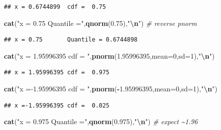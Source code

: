 \documentclass[
  lang=cn,
  11pt,
  scheme=chinese,
  chinesefont=nofont,
  citestyle=gb7714-2015,
  bibstyle=gb7714-2015]{elegantbook}
\newenvironment{Shaded}{\begin{snugshade}}{\end{snugshade}}
\newcommand{\AttributeTok}[1]{\textcolor[rgb]{0.13,0.29,0.53}{#1}}
\newcommand{\CommentTok}[1]{\textcolor[rgb]{0.56,0.35,0.01}{\textit{#1}}}
\newcommand{\DecValTok}[1]{\textcolor[rgb]{0.00,0.00,0.81}{#1}}
\newcommand{\FloatTok}[1]{\textcolor[rgb]{0.00,0.00,0.81}{#1}}
\newcommand{\FunctionTok}[1]{\textcolor[rgb]{0.13,0.29,0.53}{\textbf{#1}}}
\newcommand{\NormalTok}[1]{#1}
\newcommand{\SpecialCharTok}[1]{\textcolor[rgb]{0.81,0.36,0.00}{\textbf{#1}}}
\newcommand{\StringTok}[1]{\textcolor[rgb]{0.31,0.60,0.02}{#1}}
\begin{document}
\begin{verbatim}
## x = 0.6744899  cdf =  0.75
\end{verbatim}

\begin{Shaded}
\begin{Highlighting}[]
\FunctionTok{cat}\NormalTok{(}\StringTok{"x = 0.75       Quantile ="}\NormalTok{,}\FunctionTok{qnorm}\NormalTok{(}\FloatTok{0.75}\NormalTok{),}\StringTok{"}\SpecialCharTok{\textbackslash{}n}\StringTok{"}\NormalTok{) }\CommentTok{\# reverse pnorm  }
\end{Highlighting}
\end{Shaded}

\begin{verbatim}
## x = 0.75       Quantile = 0.6744898
\end{verbatim}

\begin{Shaded}
\begin{Highlighting}[]
\FunctionTok{cat}\NormalTok{(}\StringTok{"x = 1.95996395 cdf = "}\NormalTok{,}\FunctionTok{pnorm}\NormalTok{(}\FloatTok{1.95996395}\NormalTok{,}\AttributeTok{mean=}\DecValTok{0}\NormalTok{,}\AttributeTok{sd=}\DecValTok{1}\NormalTok{),}\StringTok{"}\SpecialCharTok{\textbackslash{}n}\StringTok{"}\NormalTok{)  }
\end{Highlighting}
\end{Shaded}

\begin{verbatim}
## x = 1.95996395 cdf =  0.975
\end{verbatim}

\begin{Shaded}
\begin{Highlighting}[]
\FunctionTok{cat}\NormalTok{(}\StringTok{"x ={-}1.95996395 cdf = "}\NormalTok{,}\FunctionTok{pnorm}\NormalTok{(}\SpecialCharTok{{-}}\FloatTok{1.95996395}\NormalTok{,}\AttributeTok{mean=}\DecValTok{0}\NormalTok{,}\AttributeTok{sd=}\DecValTok{1}\NormalTok{),}\StringTok{"}\SpecialCharTok{\textbackslash{}n}\StringTok{"}\NormalTok{)  }
\end{Highlighting}
\end{Shaded}

\begin{verbatim}
## x =-1.95996395 cdf =  0.025
\end{verbatim}

\begin{Shaded}
\begin{Highlighting}[]
\FunctionTok{cat}\NormalTok{(}\StringTok{"x = 0.975      Quantile ="}\NormalTok{,}\FunctionTok{qnorm}\NormalTok{(}\FloatTok{0.975}\NormalTok{),}\StringTok{"}\SpecialCharTok{\textbackslash{}n}\StringTok{"}\NormalTok{) }\CommentTok{\# expect \textasciitilde{}1.96  }
\end{Highlighting}
\end{Shaded}
\end{document}
